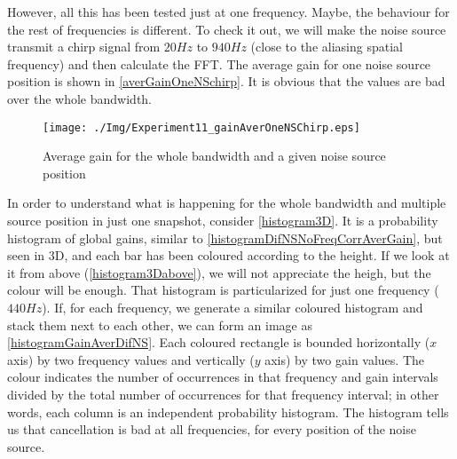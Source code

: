 However, all this has been tested just at one frequency. Maybe, the behaviour for the rest of frequencies is different. To check it out, we will make the noise source transmit a chirp signal from $20 \si{Hz}$ to $940 \si{Hz}$ (close to the aliasing spatial frequency) and then calculate the FFT. The average gain for one noise source position is shown in \autoref{averGainOneNSchirp}.
It is obvious that the values are bad over the whole bandwidth.

\begin{figure}[h]
	\centering
	\texttt{[image: ./Img/Experiment11\_gainAverOneNSChirp.eps]}
	\caption{Average gain for the whole bandwidth and a given noise source position}
	\label{averGainOneNSchirp}
\end{figure}


In order to understand what is happening for the whole bandwidth and multiple source position in just one snapshot, consider \autoref{histogram3D}. It is a probability histogram of global gains, similar to \autoref{histogramDifNSNoFreqCorrAverGain}, but seen in 3D, and each bar has been coloured according to the height. If we look at it from above (\autoref{histogram3Dabove}), we will not appreciate the heigh, but the colour will be enough.
That histogram is particularized for just one frequency ($440\si{Hz}$). If, for each frequency, we generate a similar coloured histogram and stack them next to each other, we can form an image as \autoref{histogramGainAverDifNS}. %
Each coloured rectangle is bounded horizontally ($x$ axis) by two frequency values and vertically ($y$ axis) by two gain values. The colour indicates the number of occurrences in that frequency and gain intervals divided by the total number of occurrences for that frequency interval;
in other words, each column is an independent probability histogram. The histogram tells us that cancellation is bad at all frequencies, for every position of the noise source.

